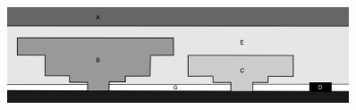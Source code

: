 \begin{figure}[ht]
    \centering
    \includegraphics[width=0.9\textwidth]{figures/classes.png}
    \caption{}
    \label{fig:diversion}
\end{figure}

